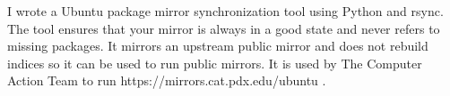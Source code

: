 {
  I wrote a Ubuntu package mirror synchronization tool using Python and rsync. The tool ensures that your mirror is always in a good state and never refers to missing packages. It mirrors an upstream public mirror and does not rebuild indices so it can be used to run public mirrors. It is used by The Computer Action Team to run https://mirrors.cat.pdx.edu/ubuntu .
}
